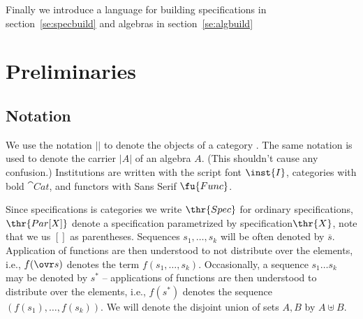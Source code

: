 Finally we introduce a language for building specifications in section~\ref{se:specbuild} and algebras in section~\ref{se:algbuild}  

\section{Preliminaries}\label{se:pre}

\subsection{Notation}
We use the notation $|${}$|$ to denote the objects of a category
. The same notation is used to denote the carrier $|A|$ of an algebra
$A$. (This shouldn't cause any confusion.)  Institutions are written with
the script font $\inst{I}$, categories with bold $\cat{Cat}$, and functors with
Sans Serif $\fu{Func}$.

Since specifications is categories we write $\thr{Spec}$ for ordinary specifications, $\thr{Par[X]}$ denote a specification parametrized by specification$\thr{X}$, note that we us $[]$ as parentheses.
 Sequences $s_1, \ldots, s_k$ will be often denoted
by $\overline{s}$. Application of functions are then understood to not
distribute over the elements, i.e., $f(\ovr s)$ denotes the term
$f(s_1,\ldots, s_k)$.  
Occasionally, a sequence $s_1 \ldots s_k$ may be denoted by $s^*$ -- 
applications of functions are then understood to
distribute over the elements, i.e., $f(s^*)$ denotes the sequence
$(f(s_1),\ldots, f(s_k))$. We will denote the disjoint union of sets $A,B$ by $A \uplus B$.


